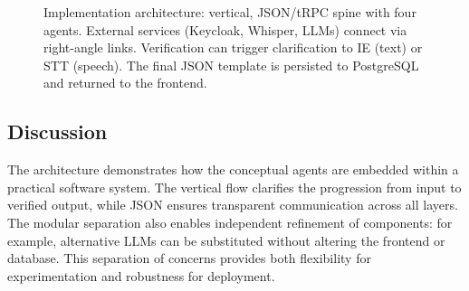 \begin{figure}[H]
{%
}
\caption{Implementation architecture: vertical, JSON/tRPC spine with four agents. External services (Keycloak, Whisper, LLMs) connect via right-angle links. Verification can trigger clarification to IE (text) or STT (speech). The final JSON template is persisted to PostgreSQL and returned to the frontend.}
\label{fig:impl-architecture}
\end{figure}


\subsection*{Discussion}
The architecture demonstrates how the conceptual agents are embedded within a practical software system. The vertical flow clarifies the progression from input to verified output, while JSON ensures transparent communication across all layers. The modular separation also enables independent refinement of components: for example, alternative LLMs can be substituted without altering the frontend or database. This separation of concerns provides both flexibility for experimentation and robustness for deployment.

